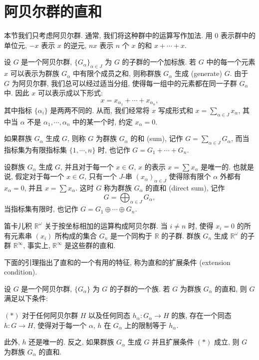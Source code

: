 \section{阿贝尔群的直和}\label{ch11:section-direct-sum}

本节我们只考虑阿贝尔群. 通常, 我们将这种群中的运算写作加法. 用 $0$ 表示群中的单位元, $-x$ 表示 $x$ 的逆元, $nx$ 表示 $n$ 个 $x$ 的和 $x+\cdots+x$.

设 $G$ 是一个阿贝尔群, $\{G_{\alpha}\}_{\alpha\in J}$ 为 $G$ 的子群的一个加标族. 若 $G$ 中的每一个元素 $x$ 可以表示为群族 $G_{\alpha}$ 中有限个成员之和, 则称群族 $G_{\alpha}$ 生成 (generate) $G$. 由于 $G$ 为阿贝尔群, 我们总可以经过适当分组, 使得每一组中的元素都在同一子群 $G_{\alpha}$ 中. 因此 $x$ 可以表示成以下形式:
\[
x=x_{\alpha_{1}}+\cdots+x_{\alpha_{n}},
\]
其中指标 $\{\alpha_{i}\}$ 是两两不同的. 从而, 我们经常将 $x$ 写成形式和 $x=\sum_{\alpha\in J}x_{\alpha}$, 其中当 $\alpha$ 不是 $\alpha_{1},\cdots,\alpha_{n}$ 中的某一个时, 约定 $x_{\alpha}=0$.

如果群族 $G_{\alpha}$ 生成 $G$, 则称 $G$ 为群族 $G_{\alpha}$ 的和 (sum), 记作 $G=\sum_{\alpha\in J}G_{\alpha}$, 而当指标集为有限指标集 $\{1,\cdots,n\}$ 时, 也记作 $G=G_{1}+\cdots+G_{n}$.

设群族 $G_{\alpha}$ 生成 $G$, 并且对于每一个 $x\in G$, $x$ 的表示 $x=\sum x_{\alpha}$ 是唯一的. 也就是说, 假定对于每一个 $x\in G$, 只有一个 $J$-串 $(x_{\alpha})_{\alpha\in J}$ 使得除有限个 $\alpha$ 外都有 $x_{\alpha}=0$, 并且 $x=\sum x_{\alpha}$. 这时 $G$ 称为群族 $G_{\alpha}$ 的直和 (direct sum), 记作
\[
G=\bigoplus_{\alpha\in J}G_{\alpha},
\]
当指标集有限时, 也记作 $G=G_{1}\oplus\cdots\oplus G_{n}$.

\begin{example}\label{ch11:ex-direct-sum-r-infty}
笛卡儿积 $\mathbb{R}^{\omega}$ 关于按坐标相加的运算构成阿贝尔群. 当 $i\neq n$ 时, 使得 $x_{i}=0$ 的所有元素串 $(x_{i})$ 所构成的集合 $G_{n}$ 是一个同构于 $\mathbb{R}$ 的子群. 群族 $G_{n}$ 生成 $\mathbb{R}^{\omega}$ 的子群 $\mathbb{R}^{\infty}$, 事实上, $\mathbb{R}^{\infty}$ 是这些群的直和.
\end{example}

下面的引理指出了直和的一个有用的特征, 称为直和的扩展条件 (extension condition).

\begin{lemma}\label{ch11:lemma-extension-condition}
设 $G$ 是一个阿贝尔群, $\{G_{\alpha}\}$ 为 $G$ 的子群的一个族. 若 $G$ 为群族 $G_{\alpha}$ 的直和, 则 $G$ 满足以下条件:

$(*)$ 对于任何阿贝尔群 $H$ 以及任何同态 $h_{\alpha}\colon G_{\alpha}\to H$ 的族, 存在一个同态 $h\colon G\to H$, 使得对于每一个 $\alpha$, $h$ 在 $G_{\alpha}$ 上的限制等于 $h_{\alpha}$.

此外, $h$ 还是唯一的. 反之, 如果群族 $G_{\alpha}$ 生成 $G$ 并且扩展条件 $(*)$ 成立, 则 $G$ 为群族 $G_{\alpha}$ 的直和.
\end{lemma}

